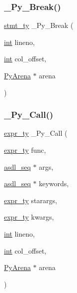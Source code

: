 \mbox{\label{_python-ast_8h_a9bddbd991d9285df556fcda52f160aec}} 
\subsubsection{\texorpdfstring{\_Py\_Break()}{\_Py\_Break()}}
{\footnotesize\ttfamily \mbox{\hyperlink{_python-ast_8h_a39618071027b661bc03e8916e664e1a7}{stmt\+\_\+ty}} \+\_\+\+Py\+\_\+\+Break (\begin{DoxyParamCaption}\item[{\mbox{\hyperlink{warnings_8h_a74f207b5aa4ba51c3a2ad59b219a423b}{int}}}]{lineno,  }\item[{\mbox{\hyperlink{warnings_8h_a74f207b5aa4ba51c3a2ad59b219a423b}{int}}}]{col\+\_\+offset,  }\item[{\mbox{\hyperlink{pyarena_8h_a9edeb357fbb27333471022a0975adb7a}{Py\+Arena}} $\ast$}]{arena }\end{DoxyParamCaption})}

\mbox{\label{_python-ast_8h_a8df37634337d0ad319ac213dc055560d}} 
\subsubsection{\texorpdfstring{\_Py\_Call()}{\_Py\_Call()}}
{\footnotesize\ttfamily \mbox{\hyperlink{_python-ast_8h_a56d3705e020a071405094a220c4592bd}{expr\+\_\+ty}} \+\_\+\+Py\+\_\+\+Call (\begin{DoxyParamCaption}\item[{\mbox{\hyperlink{_python-ast_8h_a56d3705e020a071405094a220c4592bd}{expr\+\_\+ty}}}]{func,  }\item[{\mbox{\hyperlink{structasdl__seq}{asdl\+\_\+seq}} $\ast$}]{args,  }\item[{\mbox{\hyperlink{structasdl__seq}{asdl\+\_\+seq}} $\ast$}]{keywords,  }\item[{\mbox{\hyperlink{_python-ast_8h_a56d3705e020a071405094a220c4592bd}{expr\+\_\+ty}}}]{starargs,  }\item[{\mbox{\hyperlink{_python-ast_8h_a56d3705e020a071405094a220c4592bd}{expr\+\_\+ty}}}]{kwargs,  }\item[{\mbox{\hyperlink{warnings_8h_a74f207b5aa4ba51c3a2ad59b219a423b}{int}}}]{lineno,  }\item[{\mbox{\hyperlink{warnings_8h_a74f207b5aa4ba51c3a2ad59b219a423b}{int}}}]{col\+\_\+offset,  }\item[{\mbox{\hyperlink{pyarena_8h_a9edeb357fbb27333471022a0975adb7a}{Py\+Arena}} $\ast$}]{arena }\end{DoxyParamCaption})}

